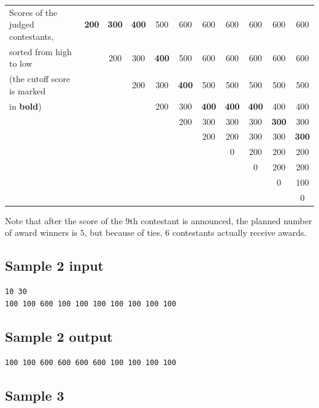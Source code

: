 \documentclass[11pt]{article}
\begin{document}
\begin{center}
\begin{tabular}{|l|c|c|c|c|c|c|c|c|c|c|}
\hline
Scores of the judged contestants,
  & \textbf{200} & \textbf{300} & \textbf{400} & 500 & 600 & 600
  & 600 & 600 & 600 & 600 \\
sorted from high to low
  &  & 200 & 300 & \textbf{400} & 500 & 600 & 600 & 600 & 600 & 600 \\
(the cutoff score is marked
  &  &  & 200 & 300 & \textbf{400} & 500 & 500 & 500 & 500 & 500 \\
in \textbf{bold})
  &  &  &  & 200 & 300 & \textbf{400} & \textbf{400} & \textbf{400}
  & 400 & 400 \\
  &  &  &  &  & 200 & 300 & 300 & 300 & \textbf{300} & 300 \\
  &  &  &  &  &  & 200 & 200 & 300 & 300 & \textbf{300} \\
  &  &  &  &  &  &  & 0 & 200 & 200 & 200 \\
  &  &  &  &  &  &  &  & 0 & 200 & 200 \\
  &  &  &  &  &  &  &  &  & 0 & 100 \\
  &  &  &  &  &  &  &  &  &  & 0 \\
\hline
\end{tabular}
\end{center}

Note that after the score of the 9th contestant is announced, the planned
number of award winners is $5$, but because of ties, $6$ contestants
actually receive awards.

\subsection*{Sample 2 input}

\begin{verbatim}
10 30
100 100 600 100 100 100 100 100 100 100
\end{verbatim}

\subsection*{Sample 2 output}

\begin{verbatim}
100 100 600 600 600 600 100 100 100 100
\end{verbatim}

\subsection*{Sample 3}
\end{document}
